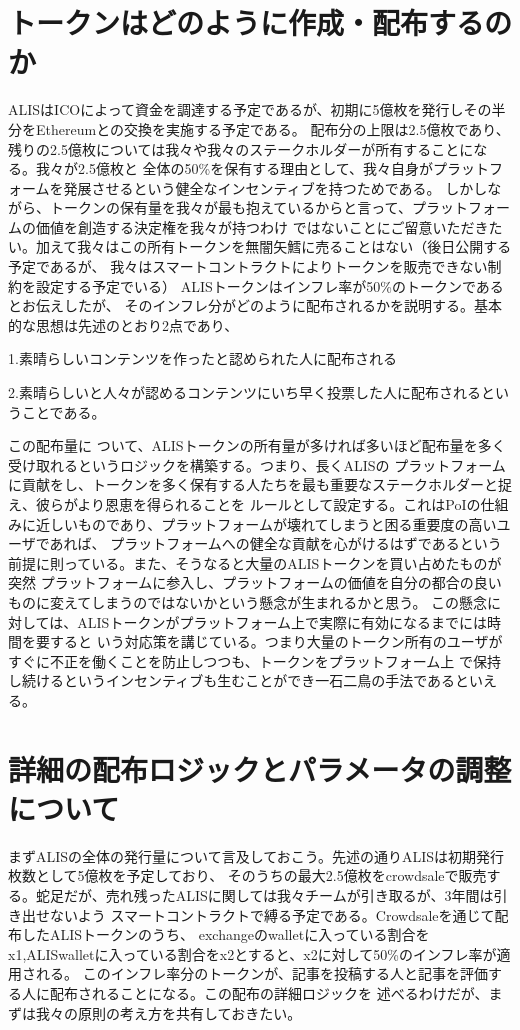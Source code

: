 \documentclass{jsarticle}
\begin{document}
\section{トークンはどのように作成・配布するのか}
ALISはICOによって資金を調達する予定であるが、初期に5億枚を発行しその半分をEthereumとの交換を実施する予定である。
配布分の上限は2.5億枚であり、残りの2.5億枚については我々や我々のステークホルダーが所有することになる。我々が2.5億枚と
全体の50\%を保有する理由として、我々自身がプラットフォームを発展させるという健全なインセンティブを持つためである。
しかしながら、トークンの保有量を我々が最も抱えているからと言って、プラットフォームの価値を創造する決定権を我々が持つわけ
ではないことにご留意いただきたい。加えて我々はこの所有トークンを無闇矢鱈に売ることはない（後日公開する予定であるが、
我々はスマートコントラクトによりトークンを販売できない制約を設定する予定でいる）
ALISトークンはインフレ率が50\%のトークンであるとお伝えしたが、
そのインフレ分がどのように配布されるかを説明する。基本的な思想は先述のとおり2点であり、

1.素晴らしいコンテンツを作ったと認められた人に配布される 

2.素晴らしいと人々が認めるコンテンツにいち早く投票した人に配布されるということである。

この配布量に
ついて、ALISトークンの所有量が多ければ多いほど配布量を多く受け取れるというロジックを構築する。つまり、長くALISの
プラットフォームに貢献をし、トークンを多く保有する人たちを最も重要なステークホルダーと捉え、彼らがより恩恵を得られることを
ルールとして設定する。これはPoIの仕組みに近しいものであり、プラットフォームが壊れてしまうと困る重要度の高いユーザであれば、
プラットフォームへの健全な貢献を心がけるはずであるという前提に則っている。また、そうなると大量のALISトークンを買い占めたものが突然
プラットフォームに参入し、プラットフォームの価値を自分の都合の良いものに変えてしまうのではないかという懸念が生まれるかと思う。
この懸念に対しては、ALISトークンがプラットフォーム上で実際に有効になるまでには時間を要すると
いう対応策を講じている。つまり大量のトークン所有のユーザがすぐに不正を働くことを防止しつつも、トークンをプラットフォーム上
で保持し続けるというインセンティブも生むことができ一石二鳥の手法であるといえる。
\section{詳細の配布ロジックとパラメータの調整について}
まずALISの全体の発行量について言及しておこう。先述の通りALISは初期発行枚数として5億枚を予定しており、
そのうちの最大2.5億枚をcrowdsaleで販売する。蛇足だが、売れ残ったALISに関しては我々チームが引き取るが、3年間は引き出せないよう
スマートコントラクトで縛る予定である。Crowdsaleを通じて配布したALISトークンのうち、
exchangeのwalletに入っている割合をx1,ALISwalletに入っている割合をx2とすると、x2に対して50\%のインフレ率が適用される。
このインフレ率分のトークンが、記事を投稿する人と記事を評価する人に配布されることになる。この配布の詳細ロジックを
述べるわけだが、まずは我々の原則の考え方を共有しておきたい。
\end{document}
